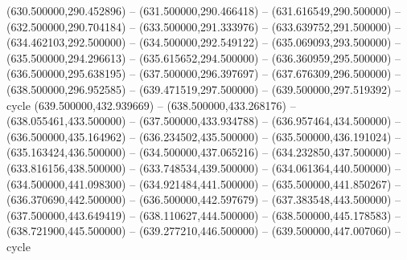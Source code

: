 (630.500000,290.452896) -- (631.500000,290.466418) -- (631.616549,290.500000) -- (632.500000,290.704184) -- (633.500000,291.333976) -- (633.639752,291.500000) -- (634.462103,292.500000) -- (634.500000,292.549122) -- (635.069093,293.500000) -- (635.500000,294.296613) -- (635.615652,294.500000) -- (636.360959,295.500000) -- (636.500000,295.638195) -- (637.500000,296.397697) -- (637.676309,296.500000) -- (638.500000,296.952585) -- (639.471519,297.500000) -- (639.500000,297.519392) -- cycle
   (639.500000,432.939669) -- (638.500000,433.268176) -- (638.055461,433.500000) -- (637.500000,433.934788) -- (636.957464,434.500000) -- (636.500000,435.164962) -- (636.234502,435.500000) -- (635.500000,436.191024) -- (635.163424,436.500000) -- (634.500000,437.065216) -- (634.232850,437.500000) -- (633.816156,438.500000) -- (633.748534,439.500000) -- (634.061364,440.500000) -- (634.500000,441.098300) -- (634.921484,441.500000) -- (635.500000,441.850267) -- (636.370690,442.500000) -- (636.500000,442.597679) -- (637.383548,443.500000) -- (637.500000,443.649419) -- (638.110627,444.500000) -- (638.500000,445.178583) -- (638.721900,445.500000) -- (639.277210,446.500000) -- (639.500000,447.007060) -- cycle
